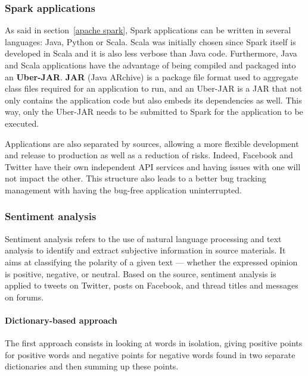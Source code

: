 \documentclass[11pt]{article}
\begin{document}
\subsubsection{Spark applications}

As said in section~\ref{apache spark}, \textsf{Spark} applications can be written in several languages: \textsf{Java}, \textsf{Python} or \textsf{Scala}. \textsf{Scala} was initially chosen since \textsf{Spark} itself is developed in \textsf{Scala} and it is also less verbose than \textsf{Java} code. Furthermore, \textsf{Java} and \textsf{Scala} applications have the advantage of being compiled and packaged into an \textsf{\textbf{Uber-JAR}}. \textsf{\textbf{JAR}} (\textsf{Java} ARchive) is a package file format used to aggregate class files required for an application to run, and an \textsf{Uber-JAR} is a \textsf{JAR} that not only contains the application code but also embeds its dependencies as well. This way, only the \textsf{Uber-JAR} needs to be submitted to \textsf{Spark} for the application to be executed.

Applications are also separated by sources, allowing a more flexible development and release to production as well as a reduction of risks. Indeed, \textsf{Facebook} and \textsf{Twitter} have their own independent API services and having issues with one will not impact the other. This structure also leads to a better bug tracking management with having the bug-free application uninterrupted.

\subsubsection{Sentiment analysis}

Sentiment analysis refers to the use of natural language processing and text analysis to identify and extract subjective information in source materials. It aims at classifying the polarity of a given text — whether the expressed opinion is positive, negative, or neutral.
Based on the source, sentiment analysis is applied to tweets on \textsf{Twitter}, posts on \textsf{Facebook}, and thread titles and messages on forums.

\paragraph{Dictionary-based approach}

The first approach consists in looking at words in isolation, giving positive points for positive words and negative points for negative words found in two separate dictionaries and then summing up these points.
\vspace{9pt}
\end{document}
